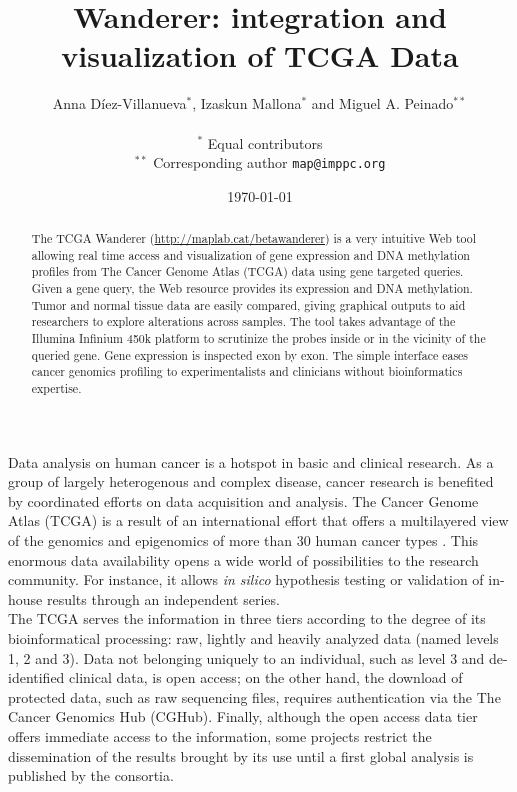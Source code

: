 \documentclass{article}
\title{Wanderer: integration and visualization of TCGA Data}
\author{Anna D{\'i}ez-Villanueva$^{*}$, Izaskun Mallona$^{*}$ and Miguel A. Peinado$^{**}$ \\
\\
 $^{*}$ Equal contributors \\
 $^{**}$ Corresponding author \texttt{map@imppc.org}
}
\date{\today}
\begin{document}
\maketitle


\begin{abstract}
The TCGA Wanderer (\url{http://maplab.cat/betawanderer}) is a very intuitive Web tool allowing real time access and visualization of gene expression and DNA methylation profiles from The Cancer Genome Atlas (TCGA) data using gene targeted queries. Given a gene query, the Web resource provides its expression and DNA methylation. Tumor and normal tissue data are easily compared, giving graphical outputs to aid researchers to explore alterations across samples. The tool takes advantage of the Illumina Infinium 450k platform to scrutinize the probes inside or in the vicinity of the queried gene. Gene expression is inspected exon by exon. The simple interface eases cancer genomics profiling to experimentalists and clinicians without bioinformatics expertise.

\end{abstract}


Data analysis on human cancer is a hotspot in basic and clinical research. As a group of largely heterogenous and complex disease, cancer research is benefited by coordinated efforts on data acquisition and analysis. The Cancer Genome Atlas (TCGA) is a result of an international effort that offers a multilayered view of the genomics and epigenomics of more than 30 human cancer types \cite{weinstein2013cancer}. This enormous data availability opens a wide world of possibilities to the research community. For instance, it allows \textit{in silico} hypothesis testing or validation of in-house results through an independent series.\\


The TCGA serves the information in three tiers according to the degree of its bioinformatical processing: raw, lightly and heavily analyzed data (named levels 1, 2 and 3). Data not belonging uniquely to an individual, such as level 3 and de-identified clinical data, is open access; on the other hand, the download of protected data, such as raw sequencing files, requires authentication via the The Cancer Genomics Hub (CGHub)\cite{wilks2014cancer}. Finally, although the open access data tier offers immediate access to the information, some projects restrict the dissemination of the results brought by its use until a first global analysis is published by the consortia.\\
\end{document}
